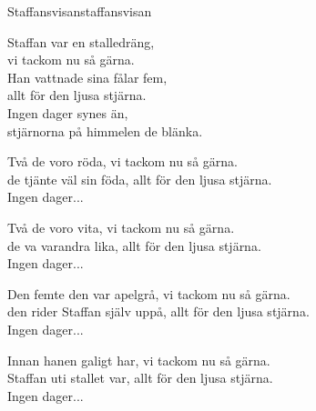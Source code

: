 \begin{song}{Staffansvisan}{staffansvisan}
\begin{vers}
Staffan var en stalledräng,\\
vi tackom nu så gärna.\\
Han vattnade sina fålar fem,\\
allt för den ljusa stjärna.\\
Ingen dager synes än,\\
stjärnorna på himmelen de blänka.\\
\end{vers}
\begin{vers}
Två de voro röda, vi tackom nu så gärna.\\
de tjänte väl sin föda, allt för den ljusa stjärna.\\
Ingen dager...\\
\end{vers}
\begin{vers}
Två de voro vita, vi tackom nu så gärna.\\
de va varandra lika, allt för den ljusa stjärna.\\
Ingen dager...\\
\end{vers}
\begin{vers}
Den femte den var apelgrå, vi tackom nu så gärna.\\
den rider Staffan själv uppå, allt för den ljusa stjärna.\\
Ingen dager...\\
\end{vers}
\begin{vers}
Innan hanen galigt har, vi tackom nu så gärna.\\
Staffan uti stallet var, allt för den ljusa stjärna.\\
Ingen dager...\\
\end{vers}
\end{song}
